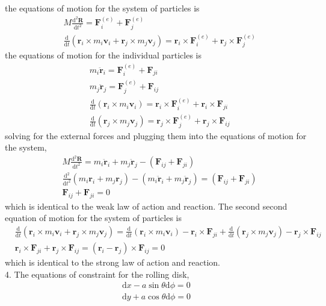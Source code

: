 \documentclass[]{article}
\numberwithin{equation}{section}
\begin{document}
the equations of motion for the system of particles is
\begin{align*}
	&M\frac{\mathrm d^2\mathbf R}{\mathrm dt^2}=\mathbf{F}_i^{(e)}+\mathbf{F}_j^{(e)}\\
	&\frac{\mathrm d}{\mathrm dt}(\mathbf{r}_i\times m_i\mathbf{v}_i+\mathbf{r}_j\times m_j\mathbf{v}_j)=\mathbf r_i\times\mathbf F_i^{(e)}+\mathbf r_j\times\mathbf F_j^{(e)}
\end{align*}
the equations of motion for the individual particles is
\begin{align*}
	&m_i\ddot{\mathbf r}_i=\mathbf{F}_i^{(e)}+\mathbf F_{ji}\\
	&m_j\ddot{\mathbf r}_j=\mathbf{F}_j^{(e)}+\mathbf F_{ij}\\
	&\frac{\mathrm d}{\mathrm dt}(\mathbf{r}_i\times m_i\mathbf{v}_i)=\mathbf r_i\times\mathbf F_i^{(e)}+\mathbf r_i\times\mathbf F_{ji}\\
	&\frac{\mathrm d}{\mathrm dt}(\mathbf{r}_j\times m_j\mathbf{v}_j)=\mathbf r_j\times\mathbf F_j^{(e)}+\mathbf r_j\times\mathbf F_{ij}
\end{align*}
solving for the external forces and plugging them into the equations of motion for the system,
\begin{align*}
	&M\frac{\mathrm d^2\mathbf R}{\mathrm dt^2}=m_i\ddot{\mathbf r}_i+m_j\ddot{\mathbf r}_j-(\mathbf{F}_{ij}+\mathbf{F}_{ji})\\
	&\frac{\mathrm d^2}{\mathrm dt^2}(m_i\mathbf r_i+m_j\mathbf r_j)-(m_i\ddot{\mathbf r}_i+m_j\ddot{\mathbf r}_j)=(\mathbf{F}_{ij}+\mathbf{F}_{ji})\\
	&\mathbf{F}_{ij}+\mathbf{F}_{ji}=0
\end{align*}
which is identical to the weak law of action and reaction. The second second equation of motion for the system of particles is 
\begin{align*}
	&\frac{\mathrm d}{\mathrm dt}(\mathbf{r}_i\times m_i\mathbf{v}_i+\mathbf{r}_j\times m_j\mathbf{v}_j)=   \frac{\mathrm d}{\mathrm dt}(\mathbf{r}_i\times m_i\mathbf{v}_i)-\mathbf r_i\times\mathbf F_{ji}+ \frac{\mathrm d}{\mathrm dt}(\mathbf{r}_j\times m_j\mathbf{v}_j)-\mathbf r_j\times\mathbf F_{ij}\\
	&\mathbf r_i\times\mathbf F_{ji}+\mathbf r_j\times\mathbf F_{ij}=(\mathbf r_i-\mathbf r_j)\times\mathbf F_{ij}=0
\end{align*}
which is identical to the strong law of action and reaction.\\
4. The equations of constraint for the rolling disk,
\begin{align*}
	\mathrm dx-a\sin\theta\mathrm d\phi=0\\
	\mathrm dy+a\cos\theta\mathrm d\phi=0
\end{align*}
\end{document}
